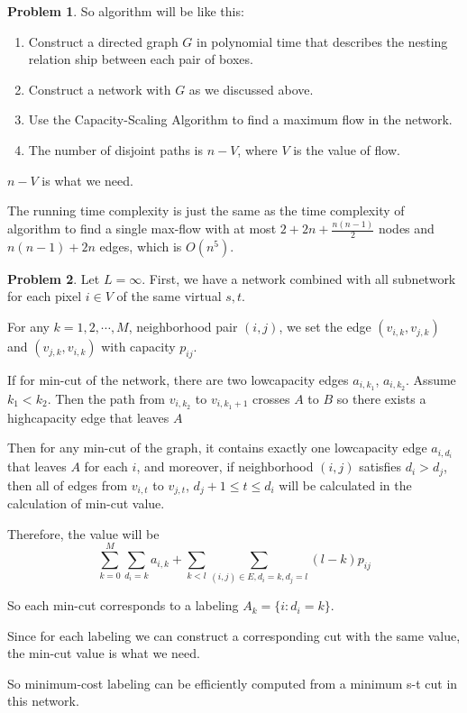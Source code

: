 \documentclass[a4paper]{article}
\theoremstyle{definition}
\newtheorem{problem}{Problem}
\theoremstyle{plain}
\numberwithin{equation}{problem}
\begin{document}
\begin{problem}
    So algorithm will be like this:

    \begin{enumerate}
        \item Construct a directed graph  $ G  $ in polynomial time that describes the nesting relation ship between each pair of boxes.
        \item Construct a network with  $ G  $ as we discussed above.
        \item Use the Capacity-Scaling Algorithm to find a maximum flow in the network.
        \item The number of disjoint paths is  $ n-V $, where  $ V $ is the value of flow.
    \end{enumerate}
     $ n-V $ is what we need.

    The running time complexity is just the same as the time complexity of algorithm to find a single max-flow with at most $ 2+2n+\frac{n(n-1)}{2} $ nodes and  $ n(n-1)+2n $ edges, which is  $ O(n^5) $. 

\end{problem}


\begin{problem}
    Let  $ L=\infty $. First, we have a network combined with all subnetwork for each pixel $ i\in V $ of the same virtual  $ s,t $.
    
    
    For any  $ k=1,2,\cdots, M $, neighborhood pair $ (i,j) $, we set the edge  $ (v_{i,k},v_{j,k}) $ and  $ (v_{j,k},v_{i,k}) $ with capacity  $ p_{ij} $.
    
    If for min-cut of the network, there are two lowcapacity edges  $ a_{i,k_1} $,  $ a_{i,k_2} $. Assume  $ k_1<k_2 $. Then the path from  $ v_{i,k_2} $ to  $ v_{i,k_1+1} $ crosses  $ A $ to  $ B $ so there exists a highcapacity edge that leaves  $ A $        


    Then for any min-cut of the graph, it contains exactly one lowcapacity edge  $ a_{i,d_i} $ that leaves  $ A $  for each  $ i $, and moreover, if neighborhood  $ (i,j) $ satisfies  $ d_i>d_j $, then all of edges from  $ v_{i,t} $ to  $ v_{j,t} $,  $ d_j+1 \leq t \leq d_i $ will be calculated in the calculation of min-cut value.
    
    Therefore, the value will be 
    \[\sum_{k=0}^M\sum_{d_i=k}a_{i,k}+\sum_{k<l}\sum_{(i,j)\in E,d_i=k,d_j=l}(l-k)p_{ij}\]

    So each min-cut corresponds to a labeling $ A_k=\{i:d_i=k\} $.
    
    Since for each labeling we  can construct a corresponding cut with the same value, the min-cut value is what we need.

    So  minimum-cost labeling can be efficiently computed from a minimum s-t cut in this network. 
\end{problem}
\end{document}
